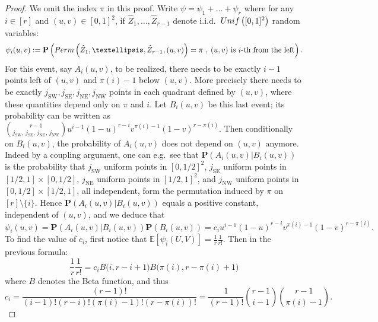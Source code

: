 \documentclass{article}
\theoremstyle{remark}
\def\m{\!-\!}
\def\p{\!+\!}
\newcommand{\mean}[1]{\mathbb{E}\left[#1\right]}
\def\P{\mathbf{P}}
\newcommand{\prob}[1]{\mathbf{P}\left(#1\right)}
\newcommand{\Unif}[1]{{\rm Unif}\left(#1\right)}
\def\carre{[0,1]^2}
\newcommand{\perm}[1]{{\rm Perm}\left(#1\right)}
\begin{document}
\begin{proof}
    We omit the index $\pi$ in this proof.
    Write $\psi = \psi_1+\dots+\psi_r$ where for any $i\in[r]$ and $(u,v)\in\carre$, if $\hat Z_1,\dots,\hat Z_{r-1}$ denote i.i.d.~$\Unif{\carre}$ random variables:
    \begin{equation*}
        \psi_i(u,v) := \P\left( \perm{\hat Z_1,\dots,\hat Z_{r-1}, (u,v)}=\pi \;,\; (u,v) \text{ is $i$-th from the left} \right).
    \end{equation*}
    For this event, say $A_i(u,v)$, to be realized, there needs to be exactly $i\m1$ points left of $(u,v)$ and $\pi(i)\m1$ below $(u,v)$.
    More precisely there needs to be exactly $j_\mathrm{SW},j_\mathrm{SE},j_\mathrm{NE},j_\mathrm{NW}$ points in each quadrant defined by $(u,v)$, where these quantities depend only on $\pi$ and $i$.
    Let $B_i(u,v)$ be this last event; its probability can be written as $\binom{r-1}{j_\mathrm{SW} ,\, j_\mathrm{SE} ,\, j_\mathrm{NE} ,\, j_\mathrm{NW}} u^{i-1} (1-u)^{r-i} v^{\pi(i)-1} (1-v)^{r-\pi(i)}$.
    Then conditionally on $B_i(u,v)$, the probability of $A_i(u,v)$ does not depend on $(u,v)$ anymore.
    Indeed by a coupling argument, one can e.g.~see that $\prob{A_i(u,v)\big|B_i(u,v)}$ is the probability that $j_\mathrm{SW}$ uniform points in $[0,1/2]^2$, $j_\mathrm{SE}$ uniform points in $[1/2,1]\!\times\![0,1/2]$, $j_\mathrm{NE}$ uniform points in $[1/2,1]^2$, and $j_\mathrm{NW}$ uniform points in $[0,1/2]\!\times\![1/2,1]$, all independent, form the permutation induced by $\pi$ on $[r]\setminus\{i\}$.
    Hence $\prob{A_i(u,v)\big|B_i(u,v)}$ equals a positive constant, independent of $(u,v)$, and we deduce that
    \begin{equation*}
        \psi_i(u,v)
        = \prob{A_i(u,v)\big|B_i(u,v)} \prob{B_i(u,v)}
        = c_i u^{i-1} (1-u)^{r-i} v^{\pi(i)-1} (1-v)^{r-\pi(i)} .
    \end{equation*}
    To find the value of $c_i$, first notice that $\mean{\psi_i(U,V)} = \frac{1}{r}\frac{1}{r!}$.
    Then in the previous formula:
    \begin{equation*}
        \frac{1}{r}\frac{1}{r!}
        = c_{i} B\big(i , r\m i\p 1\big) B\big(\pi(i) , r\m \pi(i)\p 1\big)
    \end{equation*} 
    where $B$ denotes the Beta function, and thus
    \begin{equation*}
        c_{i} = \frac{(r-1)!}{(i\m 1)!(r\m i)!(\pi(i)\m 1)!(r\m \pi(i))!} 
        = \frac{1}{(r-1)!}\binom{r\m1}{i\m1}\binom{r\m1}{\pi(i)\m1} .
    \end{equation*}

\end{proof}
\end{document}
